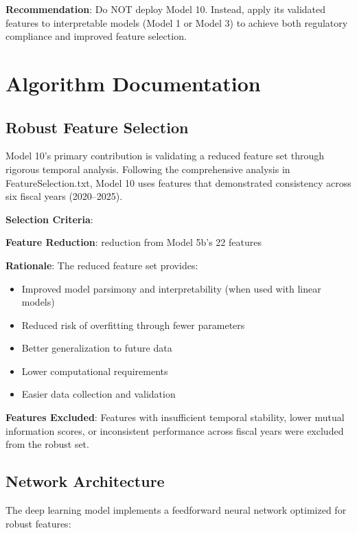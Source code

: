 \textbf{Recommendation}: Do NOT deploy Model 10. Instead, apply its \ModelTenRobustFeatures{} validated features to interpretable models (Model 1 or Model 3) to achieve both regulatory compliance and improved feature selection.

\section{Algorithm Documentation}

\subsection{Robust Feature Selection}

Model 10's primary contribution is validating a reduced feature set through rigorous temporal analysis. Following the comprehensive analysis in FeatureSelection.txt, Model 10 uses \ModelTenRobustFeatures{} features that demonstrated consistency across six fiscal years (2020--2025).

\textbf{Selection Criteria}: \ModelTenSelectionCriteria{}

\textbf{Feature Reduction}: \ModelTenFeatureReduction{} reduction from Model 5b's 22 features

\textbf{Rationale}: The reduced feature set provides:
\begin{itemize}
    \item Improved model parsimony and interpretability (when used with linear models)
    \item Reduced risk of overfitting through fewer parameters
    \item Better generalization to future data
    \item Lower computational requirements
    \item Easier data collection and validation
\end{itemize}

\textbf{Features Excluded}: Features with insufficient temporal stability, lower mutual information scores, or inconsistent performance across fiscal years were excluded from the robust set.

\subsection{Network Architecture}

The deep learning model implements a feedforward neural network optimized for \ModelTenRobustFeatures{} robust features:

